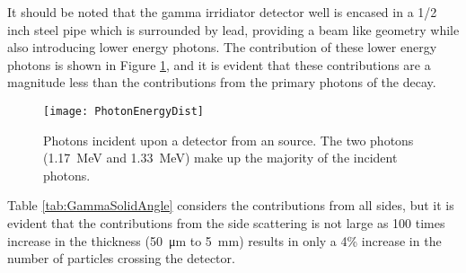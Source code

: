 \documentclass[draftcls,onecolumn]{IEEEtran}
\begin{document}
It should be noted that the gamma irridiator detector well is encased in a 1/2 inch steel pipe which is surrounded by lead, providing a beam like geometry while also introducing lower energy photons. 
The contribution of these lower energy photons is shown in Figure \ref{fig:PhotonFluxAllEnergies}, and it is evident that these contributions are a magnitude less than the contributions from the primary photons of the  decay.
\begin{figure}
  \texttt{[image: PhotonEnergyDist]}
	\caption[Photons Incident upon Detector]{Photons incident upon a detector from an  source.  The two  photons (\SI{1.17}{\MeV} and \SI{1.33}{\MeV}) make up the majority of the incident photons.}
  \label{fig:PhotonFluxAllEnergies}
\end{figure}
Table \ref{tab:GammaSolidAngle} considers the contributions from all sides, but it is evident that the contributions from the side scattering is not large as 100 times increase in the thickness (\SI{50}{\um} to \SI{5}{\mm}) results in only a 4\% increase in the number of particles crossing the detector.

\pagebreak
\end{document}
